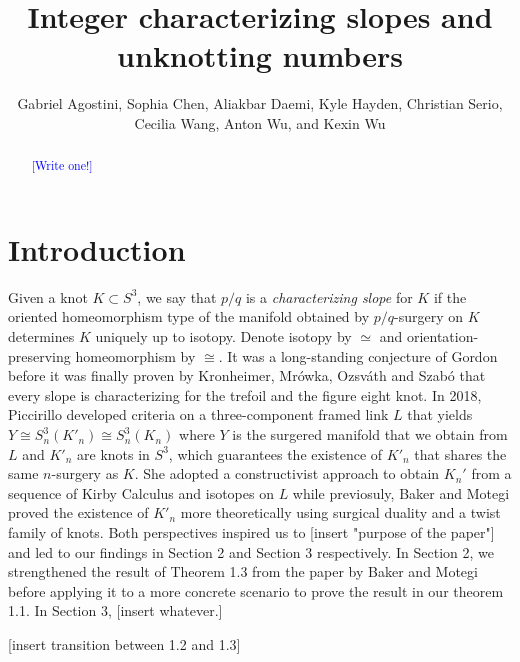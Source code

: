 \documentclass[11pt,usenames,dvipsnames,reqno]{amsart}
\numberwithin{theorem}{section}
\theoremstyle{ex}
\theoremstyle{rem}
\def\kh#1{\textcolor{Blue}{#1}}
\begin{document}


\title{Integer characterizing slopes and unknotting numbers}

\author[Agostini, Chen, Daemi, Hayden, Serio, Wang, A. Wu, and K. Wu]{Gabriel Agostini, Sophia Chen, Aliakbar Daemi, Kyle Hayden, Christian Serio, Cecilia Wang, Anton Wu, and Kexin Wu}



\begin{abstract} 
\kh{[Write one!]}
\end{abstract}


\maketitle

\section{Introduction}\label{sec:intro}

Given a knot $K\subset S^3$, we say that $p/q$  is a {\it characterizing slope} for $K$ if the oriented homeomorphism type of the manifold obtained by $p/q$-surgery on $K$ determines $K$ uniquely up to isotopy. Denote isotopy by $\simeq$ and orientation-preserving homeomorphism by $\cong$. It was a long-standing conjecture of Gordon before it was finally proven by Kronheimer, Mr\'{o}wka, Ozsv\'{a}th and Szab\'{o} that every slope is characterizing for the trefoil and the figure eight knot. In 2018, Piccirillo developed criteria on a three-component framed link $L$ that yields $Y \cong S^3_n(K'_n) \cong S^3_n(K_n)$ where $Y$ is the surgered manifold that we obtain from $L$ and $K'_n$ are knots in $S^3$, which guarantees the existence of $K'_n$ that shares the same $n$-surgery as $K$. She adopted a constructivist approach to obtain $K_n'$ from a sequence of Kirby Calculus and isotopes on $L$ while previosuly, Baker and Motegi proved the existence of $K'_n$ more theoretically using surgical duality and a twist family of knots. Both perspectives inspired us to [insert "purpose of the paper"] and led to our findings in Section 2 and Section 3 respectively. In Section 2, we strengthened the result of Theorem 1.3 from the paper by Baker and Motegi before applying it to a more concrete scenario to prove the result in our theorem 1.1. In Section 3, [insert whatever.]

[insert transition between 1.2 and 1.3]
\end{document}
